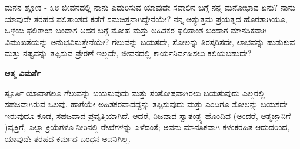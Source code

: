 \newpage
\begin{mananam}{\mananamfont ಮನನ ಶ್ಲೋಕ - ೩೮}
\small \mananatext ಜೀವನದಲ್ಲಿ ನಾನು ಎದುರಿಸುವ ಯಾವುದೇ ಸವಾಲಿನ ಬಗ್ಗೆ ನನ್ನ ಮನೋಭಾವ ಏನು? ನಾನು ಯಾವುದೇ ತರಹದ ಫಲಿತಾಂಶದ ಕಡೆಗೆ ಸಮಚಿತ್ತನಾಗಿದ್ದೇನೆಯೇ? ನನ್ನ ಅತ್ಯುತ್ತಮ ಪ್ರಯತ್ನದ ಹೊರತಾಗಿಯೂ, ಒಳ್ಳೆಯ ಫಲಿತಾಂಶ ಬಂದಾಗ ಅದರ ಬಗ್ಗೆ ಮೋಹ ಮತ್ತು ಅಹಿತಕರ ಫಲಿತಾಂಶ ಬಂದಾಗ ಮಾನಸಿಕವಾಗಿ ವಿಮುಖತೆಯನ್ನು ಅನುಭವಿಸುತ್ತೇನೆಯೇ? ಗೆಲುವನ್ನು ಬಯಸದೇ, ಸೋಲನ್ನು ತಿರಸ್ಕರಿಸದೇ, ಲಾಭವನ್ನು ಹುಡುಕುವ ಮತ್ತು ನಷ್ಟವನ್ನು ತಪ್ಪಿಸುವ ಪ್ರೇರಣೆ ಇಲ್ಲದೇ, ಜೀವನದಲ್ಲಿ  ಕಾರ್ಯನಿರ್ವಹಿಸಲು ಕಲಿಯಬಹುದೇ?

\end{mananam}
\WritingHand\enspace\textbf{ಆತ್ಮ ವಿಮರ್ಶೆ}
\begin{inspiration}{\mananamfont ಸ್ಪೂರ್ತಿ}
\small \mananatext ಯಾವಾಗಲೂ ಗೆಲುವನ್ನು ಬಯಸುವುದು ಮತ್ತು ಸಂತೋಷವಾಗಿರಲು ಬಯಸುವುದು ಎಲ್ಲರಲ್ಲಿ ಸಹಜವಾಗಿರುವ ಒಲವು. ಹಾಗೆಯೇ ಅಹಿತಕರವಾದದ್ದನ್ನು ತಪ್ಪಿಸುವುದು ಮತ್ತು ಎಂದಿಗೂ ಸೋಲನ್ನು ಬಯಸದೇ ಇರುವುದೂ ಕೂಡ, ಸಹಜವಾದ ಪ್ರವೃತ್ತಿಯಾಗಿದೆ. ಆದರೆ, ನಿಜವಾದ ಸ್ವಾತಂತ್ರ್ಯ ಹೊಂದಿದ (ಅಂದರೆ, ಆತ್ಮಜ್ಞಾನಿಗೆ )ವ್ಯಕ್ತಿಗೆ,  ಎಲ್ಲಾ ಕ್ರಿಯೆಗಳೂ ನೀರಿನಲ್ಲಿ ರೇಖೆಗಳನ್ನು  ಎಳೆದಂತೆ; ಅವನು ಮಾನಸಿಕವಾಗಿ ಕಳಂಕರಹಿತ ಆದುದರಿಂದ, ಯಾವುದೇ ತರಹದ ಕರ್ಮದ ಬಂಧನ ಅವನಿಗಿಲ್ಲ.
\end{inspiration}
\newpage


